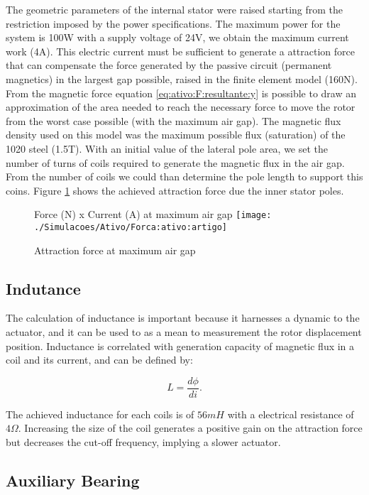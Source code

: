 \documentclass[journal,a4paper,oneside,twocolumn]{IEEEtran}
\begin{document}
The geometric parameters of the internal stator were raised starting from the restriction imposed by the power specifications. The maximum power for the system is 100W with a  supply voltage of 24V, we obtain the maximum current work (4A). This electric current must be sufficient to generate a attraction force that can compensate the force generated by the passive circuit (permanent magnetics) in the largest gap possible, raised in the finite element model (160N). From the magnetic force equation \eqref{eq:ativo:F:resultante:y} is possible to draw an approximation of the area needed to reach the necessary force to move the rotor from the worst case possible (with the maximum air gap). The magnetic flux density used on this model was the maximum possible flux (saturation) of the 1020 steel (1.5T). With an initial value of the lateral pole area, we set the number of turns of coils required to generate the magnetic flux in the air gap. From the number of coils we could than determine the pole length to support this coins. Figure \ref{fig:magnetico:ativo:comsol} shows the achieved attraction force due the inner stator poles. 

\begin{figure}
\centering
Force (N) x Current (A) at maximum air gap
\texttt{[image: ./Simulacoes/Ativo/Forca:ativo:artigo]}
\caption{Attraction force at maximum air gap }
\label{fig:magnetico:ativo:comsol}
\end{figure}

\subsection{Indutance} \label{subsec:at:indutancia}

The calculation of inductance is important because it harnesses a dynamic to the actuator, and it can be used to as a mean to measurement the rotor displacement position. Inductance is correlated with generation capacity of magnetic flux in a coil and its current, and can be defined by:

\begin{equation}
	L = \frac{d \phi}{di} .
\end{equation}

The achieved inductance for each coils is of $56 mH$ with a electrical resistance of $4 \Omega$. Increasing the size of the coil generates a positive gain on the attraction force but decreases the cut-off frequency, implying a slower actuator.

\subsection{Auxiliary Bearing}
\end{document}
